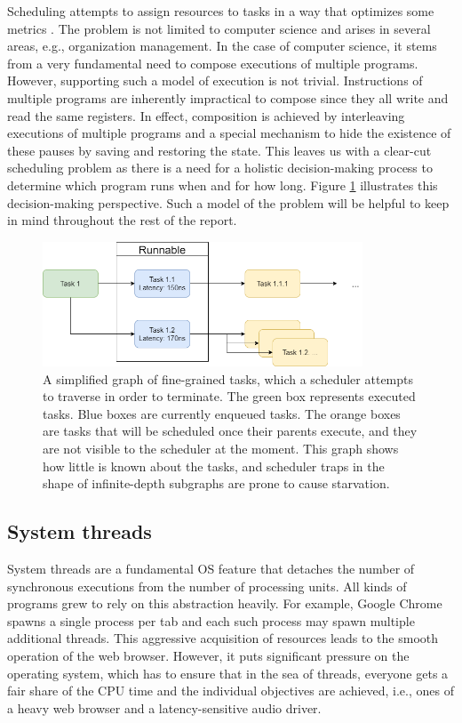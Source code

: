 \documentclass[12pt,a4paper,twoside]{report}
\begin{document}
Scheduling attempts to assign resources to tasks in a way that optimizes some metrics \cite{Pinedo2012}. The problem is not limited to computer science and arises in several areas, e.g., organization management. In the case of computer science, it stems from a very fundamental need to compose executions of multiple programs. However, supporting such a model of execution is not trivial. Instructions of multiple programs are inherently impractical to compose since they all write and read the same registers. In effect, composition is achieved by interleaving executions of multiple programs and a special mechanism to hide the existence of these pauses by saving and restoring the state. This leaves us with a clear-cut scheduling problem as there is a need for a holistic decision-making process to determine which program runs when and for how long. Figure \ref{fig:sched-graph} illustrates this decision-making perspective. Such a model of the problem will be helpful to keep in mind throughout the rest of the report. 

\begin{figure}
    \centering
    \includegraphics[width=0.85\textwidth]{scheduler_graph.png}
    \caption{A simplified graph of fine-grained tasks, which a scheduler attempts to traverse in order to terminate. The green box represents executed tasks. Blue boxes are currently enqueued tasks. The orange boxes are tasks that will be scheduled once their parents execute, and they are not visible to the scheduler at the moment. This graph shows how little is known about the tasks, and scheduler traps in the shape of infinite-depth subgraphs are prone to cause starvation.}
   \label{fig:sched-graph}
\end{figure}

\subsection{System threads}
\label{section:system-threads}
System threads are a fundamental OS feature that detaches the number of synchronous executions from the number of processing units. All kinds of programs grew to rely on this abstraction heavily. For example, Google Chrome spawns a single process per tab \cite{Howwebbr64:online} and each such process may spawn multiple additional threads. This aggressive acquisition of resources leads to the smooth operation of the web browser. However, it puts significant pressure on the operating system, which has to ensure that in the sea of threads, everyone gets a fair share of the CPU time and the individual objectives are achieved, i.e., ones of a heavy web browser and a latency-sensitive audio driver.
\end{document}
